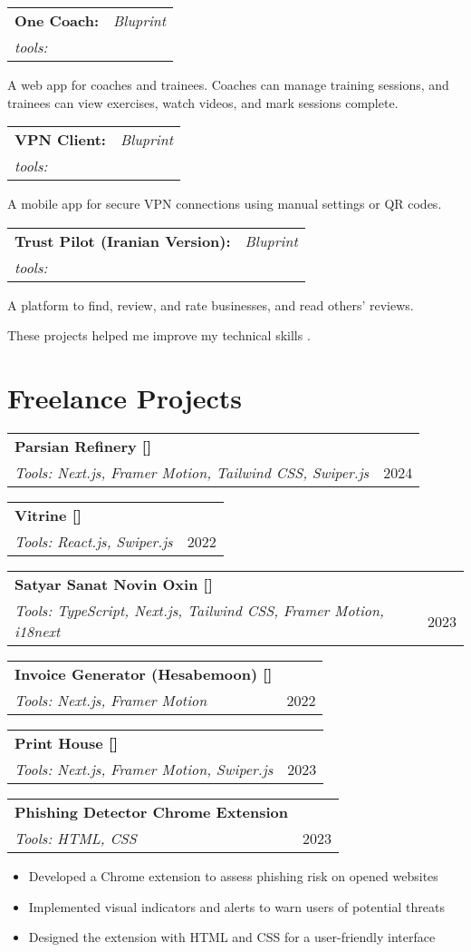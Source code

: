 \documentclass[a4paper,11pt]{article}
\makeatletter
\newcommand{\resumeSubheading}[4]{
\vspace{0.5mm}\item
    \begin{tabular*}{0.98\textwidth}[t]{l@{\extracolsep{\fill}}r}
        \textbf{#1} & \textit{\footnotesize{#4}} \\
        \textit{\footnotesize{#3}} &  \footnotesize{#2}\\
    \end{tabular*}
    \vspace{-2.4mm}
}
\newcommand{\resumeItemListStart}{\begin{itemize}[leftmargin=*,labelsep=1mm,itemsep=0.5mm]}
\newcommand{\resumeItemListEnd}{\end{itemize}\vspace{-2mm}}
\makeatother
\begin{document}
\resumeSubheading {One Coach:} {}
{tools:}{Bluprint} 

  \item A web app for coaches and trainees. Coaches can manage training sessions, and trainees can view exercises, watch videos, and mark sessions complete.


\resumeSubheading {VPN Client:} {}
{tools:}{Bluprint} 

  \item A mobile app for secure VPN connections using manual settings or QR codes.


\resumeSubheading {Trust Pilot (Iranian Version):}{}
{tools:}{Bluprint} 
\item A platform to find, review, and rate businesses, and read others’ reviews.

 \vspace{6mm}
These projects helped me improve my technical skills .


\vspace{6mm}

\section{\textbf{Freelance Projects}}
\vspace{-0.4mm}


\resumeSubheading
     {Parsian Refinery [\href{http://parsianrefinery.com}{\faIcon{globe}}]}{2024}
     {Tools: Next.js, Framer Motion, Tailwind CSS, Swiper.js}
     {}

 \resumeSubheading
  {Vitrine [\href{https://vitrin.semnan.ac.ir}{\faIcon{globe}}]}{2022}
  {Tools: React.js, Swiper.js}
{}
\resumeSubheading
    {Satyar Sanat Novin Oxin [\href{https://ssnoc.com/}{\faIcon{globe}}]}{2023}
    {Tools: TypeScript, Next.js, Tailwind CSS, Framer Motion, i18next}
    {}
 \resumeSubheading
  {Invoice Generator (Hesabemoon) [\href{https://hesabemoonv2.vercel.app/home}{\faIcon{globe}}]}{2022}
  {Tools: Next.js, Framer Motion}
{}
 \resumeSubheading
  {Print House [\href{https://print-house.vercel.app}{\faIcon{globe}}]}{2023}
  {Tools: Next.js, Framer Motion, Swiper.js}
  {}
 \resumeSubheading
  {Phishing Detector Chrome Extension}{2023}
  {Tools: HTML, CSS}
  {}
\resumeItemListStart
  \item Developed a Chrome extension to assess phishing risk on opened websites
  \item Implemented visual indicators and alerts to warn users of potential threats
  \item Designed the extension with HTML and CSS for a user-friendly interface
\resumeItemListEnd
\end{document}
